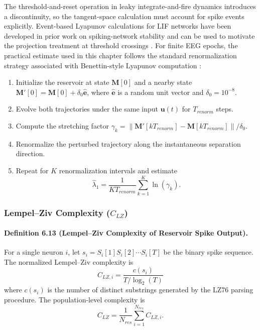 The threshold-and-reset operation in leaky integrate-and-fire dynamics introduces a discontinuity, so the tangent-space calculation must account for spike events explicitly. Event-based Lyapunov calculations for LIF networks have been developed in prior work on spiking-network stability and can be used to motivate the projection treatment at threshold crossings \cite{monteforte_dynamic_2012}. For finite EEG epochs, the practical estimate used in this chapter follows the standard renormalization strategy associated with Benettin-style Lyapunov computation \cite{benettin_lyapunov_1980}:
\begin{enumerate}
    \item Initialize the reservoir at state $\mathbf{M}[0]$ and a nearby state $\mathbf{M}'[0]=\mathbf{M}[0]+\delta_0\hat{\mathbf{e}}$, where $\hat{\mathbf{e}}$ is a random unit vector and $\delta_0=10^{-8}$.
    \item Evolve both trajectories under the same input $\mathbf{u}(t)$ for $T_{renorm}$ steps.
    \item Compute the stretching factor $\gamma_k = \lVert \mathbf{M}'[kT_{renorm}] - \mathbf{M}[kT_{renorm}] \rVert/\delta_0$.
    \item Renormalize the perturbed trajectory along the instantaneous separation direction.
    \item Repeat for $K$ renormalization intervals and estimate
    \begin{equation}
    \hat{\lambda}_1 = \frac{1}{KT_{renorm}}\sum_{k=1}^{K}\ln(\gamma_k).
    \end{equation}
\end{enumerate}

\subsubsection{Lempel--Ziv Complexity ($C_{LZ}$)}

\paragraph{Definition 6.13 (Lempel--Ziv Complexity of Reservoir Spike Output).}
For a single neuron $i$, let $s_i=S_i[1]S_i[2]\cdots S_i[T]$ be the binary spike sequence. The normalized Lempel--Ziv complexity is
\begin{equation}
C_{LZ,i}=\frac{c(s_i)}{T/\log_2(T)}
\end{equation}
where $c(s_i)$ is the number of distinct substrings generated by the LZ76 parsing procedure. The population-level complexity is
\begin{equation}
C_{LZ}=\frac{1}{N_{res}}\sum_{i=1}^{N_{res}} C_{LZ,i}.
\end{equation}

